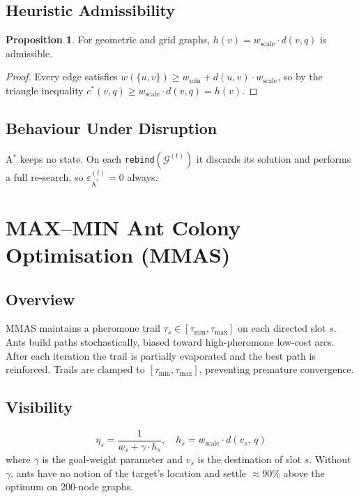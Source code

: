\documentclass[11pt,a4paper]{article}
\theoremstyle{definition}
\newtheorem{proposition}{Proposition}[section]
\newcommand{\calG}{\mathcal{G}}
\newcommand{\excess}{\varepsilon}
\begin{document}
\subsection{Heuristic Admissibility}

\begin{proposition}
  For geometric and grid graphs, $h(v) = w_{\mathrm{scale}}\cdot d(v,q)$ is admissible.
\end{proposition}
\begin{proof}
  Every edge satisfies $w(\{u,v\})\ge w_{\min}+d(u,v)\cdot w_{\mathrm{scale}}$, so by
  the triangle inequality $c^*(v,q)\ge w_{\mathrm{scale}}\cdot d(v,q)=h(v)$.
\end{proof}

\subsection{Behaviour Under Disruption}

A$^*$ keeps no state.  On each \texttt{rebind}$(\calG^{(t)})$ it discards its solution
and performs a full re-search, so $\excess^{(t)}_{\mathrm{A}^*}=0$ always.


\section{MAX--MIN Ant Colony Optimisation (MMAS)}
\label{sec:aco}

\subsection{Overview}

MMAS maintains a pheromone trail $\tau_s\in[\tau_{\min},\tau_{\max}]$ on each directed
slot $s$.  Ants build paths stochastically, biased toward high-pheromone low-cost arcs.
After each iteration the trail is partially evaporated and the best path is reinforced.
Trails are clamped to $[\tau_{\min},\tau_{\max}]$, preventing premature convergence.

\subsection{Visibility}

\[
  \eta_s = \frac{1}{w_s + \gamma\cdot h_s},\quad
  h_s = w_{\mathrm{scale}}\cdot d(v_s,\,q)
\]
where $\gamma$ is the goal-weight parameter and $v_s$ is the destination of slot $s$.
Without $\gamma$, ants have no notion of the target's location and settle $\approx90\%$
above the optimum on 200-node graphs.
\end{document}
